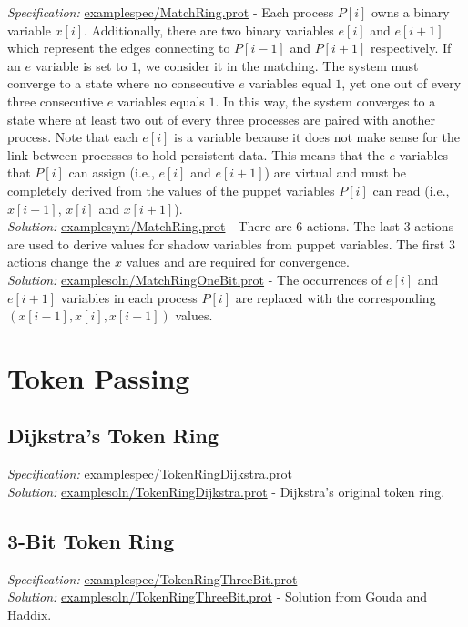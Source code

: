 \textit{Specification:} \url{examplespec/MatchRing.prot}
- Each process $P[i]$ owns a binary variable $x[i]$.
Additionally, there are two binary variables $e[i]$ and $e[i+1]$ which represent the edges connecting to $P[i-1]$ and $P[i+1]$ respectively.
If an $e$ variable is set to $1$, we consider it in the matching.
The system must converge to a state where no consecutive $e$ variables equal $1$, yet one out of every three consecutive $e$ variables equals $1$.
In this way, the system converges to a state where at least two out of every three processes are paired with another process.
Note that each $e[i]$ is a  variable because it does not make sense for the link between processes to hold persistent data.
This means that the $e$ variables that $P[i]$ can assign (i.e., $e[i]$ and $e[i+1]$) are virtual and must be completely derived from the values of the puppet variables $P[i]$ can read (i.e., $x[i-1]$, $x[i]$ and $x[i+1]$).
\\\textit{Solution:} \url{examplesynt/MatchRing.prot}
- There are $6$ actions.
The last $3$ actions are used to derive values for shadow variables from puppet variables.
The first $3$ actions change the $x$ values and are required for convergence.
\\\textit{Solution:} \url{examplesoln/MatchRingOneBit.prot}
- The occurrences of $e[i]$ and $e[i+1]$ variables in each process $P[i]$ are replaced with the corresponding $(x[i-1],x[i],x[i+1])$ values.

\section{Token Passing}

\subsection{Dijkstra's Token Ring}

\textit{Specification:} \url{examplespec/TokenRingDijkstra.prot}
\\\textit{Solution:} \url{examplesoln/TokenRingDijkstra.prot}
- Dijkstra's original token ring.

\subsection{3-Bit Token Ring}

\textit{Specification:} \url{examplespec/TokenRingThreeBit.prot}
\\\textit{Solution:} \url{examplesoln/TokenRingThreeBit.prot}
- Solution from Gouda and Haddix.

